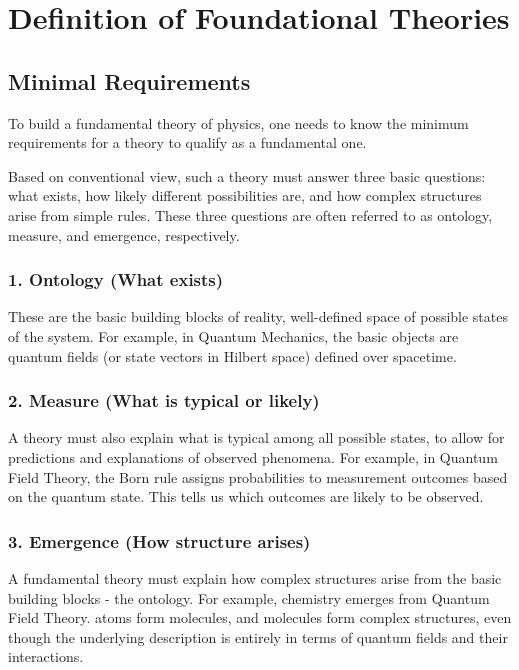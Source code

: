 \chapter{Definition of Foundational Theories}
\label{chap:definition-of-foundational-theories}


\section{Minimal Requirements}

To build a fundamental theory of physics, one needs to know the minimum requirements
for a theory to qualify as a fundamental one.

Based on conventional view, such a theory must answer three basic questions:
what exists, how likely different possibilities are, and how complex structures arise from simple rules.
These three questions are often referred to as ontology, measure, and emergence, respectively.


\subsection*{1. Ontology (What exists)}

These are the basic building blocks of reality, well-defined space of possible states of the system.
For example, in Quantum Mechanics, the basic objects are quantum fields (or state vectors in Hilbert space) defined over spacetime.


\subsection*{2. Measure (What is typical or likely)}

A theory must also explain what is typical among all possible states, to allow for predictions and explanations of observed phenomena.
For example, in Quantum Field Theory, the Born rule assigns probabilities to measurement outcomes
based on the quantum state. This tells us which outcomes are likely to be observed.

\subsection*{3. Emergence (How structure arises)}

A fundamental theory must explain how complex structures arise from the basic building blocks - the ontology.
For example, chemistry emerges from Quantum Field Theory.
atoms form molecules, and molecules form complex structures, even though the underlying description
is entirely in terms of quantum fields and their interactions.


